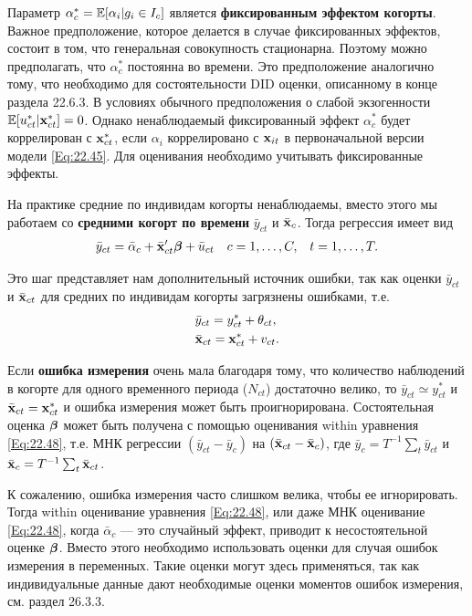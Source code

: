 Параметр $\alpha^*_c=\mathbb{E}[\alpha_i|g_i \in I_c]$ является \textbf{фиксированным эффектом когорты}. Важное предположение, которое делается в случае фиксированных эффектов, состоит в том, что генеральная совокупность стационарна. Поэтому можно предполагать, что $\alpha^*_c$ постоянна во времени. Это предположение аналогично тому, что необходимо для состоятельности DID оценки, описанному в конце раздела 22.6.3. В условиях обычного предположения о слабой экзогенности $\mathbb{E}[u^*_{ct}|\mathbf{x}^*_{ct}]=0$. Однако ненаблюдаемый фиксированный эффект $\alpha^*_c$ будет коррелирован с $\mathbf{x}^*_{ct}$, если $\alpha_i$ коррелировано с $\mathbf{x}_{it}$ в первоначальной версии модели \ref{Eq:22.45}. Для оценивания необходимо учитывать фиксированные эффекты.

На практике средние по индивидам когорты ненаблюдаемы, вместо этого мы работаем со \textbf{средними когорт по времени} $\bar{y}_{ct}$ и $\bar{\mathbf{x}}_{c}$. Тогда регрессия имеет вид
 \begin{align}
& \bar{y}_{ct}=\bar{\alpha}_c+\bar{\mathbf{x}}'_{ct}\bm{\beta}+\bar{u}_{ct}
& c=1, \dots, C, &
& t=1, \dots, T.
\label{Eq:22.48}
\end{align}

Это шаг представляет нам дополнительный источник ошибки, так как оценки $\bar{y}_{ct}$ и $\bar{\mathbf{x}}_{ct}$ для средних по индивидам когорты загрязнены  ошибками, т.е.
 \begin{align}
& \bar{y}_{ct}=y^*_{ct}+\theta_{ct},
\label{Eq:22.49} \\
& \bar{\mathbf{x}}_{ct}=\mathbf{x}^*_{ct}+v_{ct}. \nonumber
\end{align}

Если \textbf{ошибка измерения} очень мала благодаря тому, что количество наблюдений в когорте для одного временного периода ($N_{ct}$) достаточно велико, то $\bar{y}_{ct} \simeq y^*_{ct}$ и $\bar{\mathbf{x}}_{ct}=\mathbf{x}^*_{ct}$  и ошибка измерения может быть проигнорирована. Состоятельная оценка $\bm{\beta}$ может быть получена с помощью оценивания within уравнения \ref{Eq:22.48}, т.е. МНК регрессии $(\bar{y}_{ct}-\bar{y}_c)$ на $(\bar{\mathbf{x}}_{ct}-\bar{\mathbf{x}}_c)$, где $\bar{y}_c=T^{-1} \sum_t \bar{y}_{ct}$ и $\bar{\mathbf{x}}_c=T^{-1}\sum_t \bar{\mathbf{x}}_{ct}$.

К сожалению, ошибка измерения часто слишком велика, чтобы ее игнорировать. Тогда within оценивание уравнения \ref{Eq:22.48}, или даже МНК оценивание \ref{Eq:22.48}, когда $\bar{\alpha}_c$  --- это случайный эффект, приводит к несостоятельной оценке $\bm{\beta}$. Вместо этого необходимо использовать оценки для случая ошибок измерения в переменных. Такие оценки могут здесь применяться, так как индивидуальные данные дают необходимые оценки моментов ошибок измерения, см. раздел 26.3.3.


